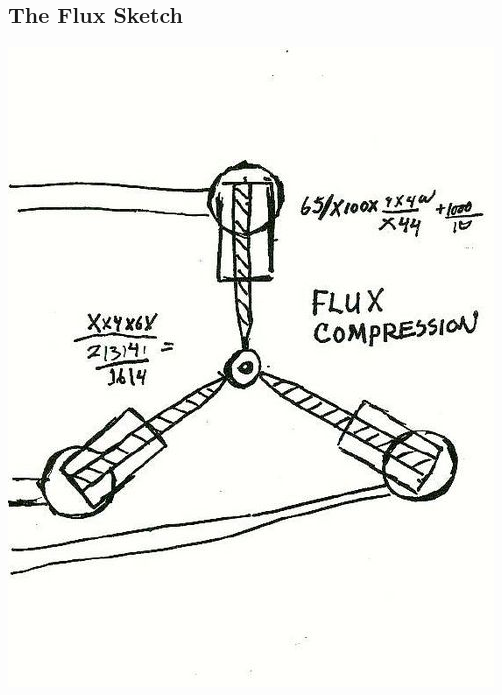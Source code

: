 \begin{appendices}


\section{The Flux Sketch}
\includegraphics[width=\textwidth]{fig/flux_sketch.jpg}
\label{appx: Flux Sketch}



\end{appendices}